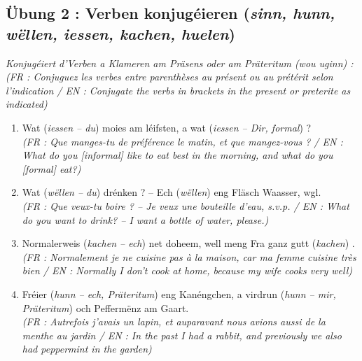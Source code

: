 \subsection*{Übung 2 : Verben konjugéieren (\textit{sinn, hunn, wëllen, iessen, kachen, huelen})}
\textit{Konjugéiert d'Verben a Klameren am Präsens oder am Präteritum (wou uginn) :} \\
\textit{\small(FR : Conjuguez les verbes entre parenthèses au présent ou au prétérit selon l'indication / EN : Conjugate the verbs in brackets in the present or preterite as indicated)}

\begin{enumerate}
    \item Wat (\textit{iessen -- du}) \underline{\hspace{2.5cm}} moies am léifsten, a wat (\textit{iessen -- Dir, formal}) \underline{\hspace{2.5cm}} ? \\
    \small\textit{(FR : Que manges-tu de préférence le matin, et que mangez-vous ? / EN : What do you [informal] like to eat best in the morning, and what do you [formal] eat?)}
    \item Wat (\textit{wëllen -- du}) \underline{\hspace{2.5cm}} drénken ? -- Ech (\textit{wëllen}) \underline{\hspace{2.5cm}} eng Fläsch Waasser, wgl. \\
    \small\textit{(FR : Que veux-tu boire ? -- Je veux une bouteille d'eau, s.v.p. / EN : What do you want to drink? -- I want a bottle of water, please.)}
    \item Normalerweis (\textit{kachen -- ech}) \underline{\hspace{2.5cm}} net doheem, well meng Fra ganz gutt (\textit{kachen}) \underline{\hspace{2.5cm}}. \\
    \small\textit{(FR : Normalement je ne cuisine pas à la maison, car ma femme cuisine très bien / EN : Normally I don't cook at home, because my wife cooks very well)}
    \item Fréier (\textit{hunn -- ech, Präteritum}) \underline{\hspace{2.5cm}} eng Kanéngchen, a virdrun (\textit{hunn -- mir, Präteritum}) \underline{\hspace{2.5cm}} och Peffermënz am Gaart. \\
    \small\textit{(FR : Autrefois j'avais un lapin, et auparavant nous avions aussi de la menthe au jardin / EN : In the past I had a rabbit, and previously we also had peppermint in the garden)}

\end{enumerate}
